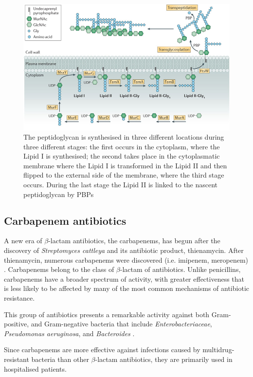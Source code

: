 \documentclass[11pt]{report}
\begin{document}
\clearpage
\begin{figure}[htp]
\centering
\includegraphics[scale=0.50]{img/Peptidoglycan.jpg}
\caption{The peptidoglycan is synthesised in three different locations during three different stages: the first occurs in the cytoplasm, where the Lipid I is synthesised; the second takes place in the cytoplasmatic membrane where the Lipid I is transformed in the Lipid II and then flipped to the external side of the membrane, where the third stage occurs. During the last stage the Lipid II is linked to the nascent peptidoglycan by PBPs \cite{Pinho2013}}
\label{pept}
\end{figure}

\subsection{Carbapenem antibiotics}
A new era of $\beta$-lactam antibiotics, the carbapenems, has begun after the discovery of \emph{Streptomyces cattleya} and its antibiotic product, thienamycin.
After thienamycin, numerous carbapenems were discovered (i.e. imipenem, meropenem) \cite{Birnbaum1985}.
Carbapenems belong to the class of $\beta$-lactam of antibiotics. 
Unlike penicillins, carbapenems have a broader spectrum of activity, with greater effectiveness that is less likely to be affected by many of the most common mechanisms of antibiotic resistance.

This group of antibiotics presents a remarkable activity against both Gram-positive, and Gram-negative bacteria that include \emph{Enterobacteriaceae}, \emph{Pseudomonas aeruginosa}, and \emph{Bacteroides} \cite{Neu1985}.

Since carbapenems are more effective against infections caused by multidrug-resistant bacteria than other $\beta$-lactam antibiotics, they are primarily used in hospitalised patients.
\end{document}

